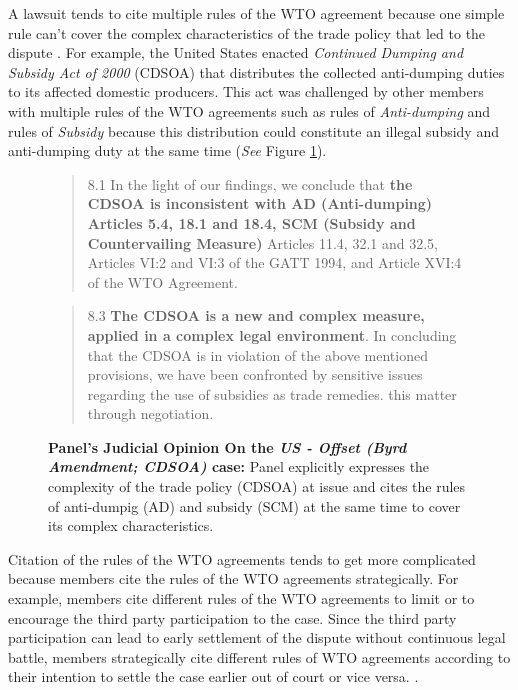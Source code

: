 A lawsuit tends to cite multiple rules of the WTO agreement because one simple rule can't cover the complex characteristics of the trade policy that led to the dispute \citep{palmeter2004dispute}.
For example, the United States enacted \textit{Continued Dumping and Subsidy Act of 2000} (CDSOA) that distributes
the collected anti-dumping duties to its affected domestic producers.
This act was challenged by other members with multiple rules of
the WTO agreements such as rules of \textit{Anti-dumping} and rules of \textit{Subsidy} because
this distribution could constitute an illegal subsidy and anti-dumping duty at the same time (\textit{See} Figure \ref{fig:complex-measure}).

\begin{figure}[h]
    \begin{quote}
        8.1 In the light of our findings, we conclude that \textbf{the CDSOA is inconsistent with AD (Anti-dumping)
        Articles 5.4, 18.1 and 18.4, SCM (Subsidy and Countervailing Measure)} Articles 11.4, 32.1 and 32.5, Articles VI:2 and VI:3 of the GATT
        1994, and Article XVI:4 of the WTO Agreement.
    \end{quote} 
    \begin{quote}
        \centering{\ldots}
    \end{quote}
    \begin{quote}
        8.3 \textbf{The CDSOA is a new and complex measure, applied in a complex legal environment}. In
        concluding that the CDSOA is in violation of the above mentioned provisions, we have been
        confronted by sensitive issues regarding the use of subsidies as trade remedies.
        this matter through negotiation.
    \end{quote} 
    \caption{\textbf{Panel's Judicial Opinion On the \textit{US - Offset (Byrd Amendment; CDSOA)} case:} Panel explicitly expresses the complexity of the trade policy (CDSOA) at issue and cites the rules of anti-dumpig (AD) and subsidy (SCM) at the same time to cover its complex characteristics.}
    \label{fig:complex-measure}
\end{figure}


Citation of the rules of the WTO agreements tends to get more complicated because members cite the
rules of the WTO agreements strategically. For example,
members cite different rules of the WTO agreements to limit or to encourage
the third party participation to the case. Since the third party participation
can lead to early settlement of the dispute without continuous
legal battle, members strategically cite different rules of WTO agreements according to their intention to
settle the case earlier out of court or vice versa.
\citep{who_gets}.

